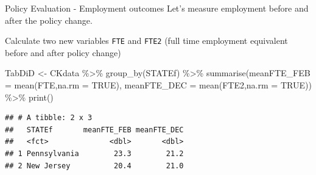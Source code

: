 \documentclass[
  ignorenonframetext,
]{beamer}
\newenvironment{Shaded}{\begin{snugshade}}{\end{snugshade}}
\newcommand{\AttributeTok}[1]{\textcolor[rgb]{0.77,0.63,0.00}{#1}}
\newcommand{\ConstantTok}[1]{\textcolor[rgb]{0.00,0.00,0.00}{#1}}
\newcommand{\FloatTok}[1]{\textcolor[rgb]{0.00,0.00,0.81}{#1}}
\newcommand{\FunctionTok}[1]{\textcolor[rgb]{0.00,0.00,0.00}{#1}}
\newcommand{\NormalTok}[1]{#1}
\newcommand{\OtherTok}[1]{\textcolor[rgb]{0.56,0.35,0.01}{#1}}
\newcommand{\SpecialCharTok}[1]{\textcolor[rgb]{0.00,0.00,0.00}{#1}}
\begin{document}
\begin{frame}[fragile]{Policy Evaluation - Employment outcomes}
\protect\hypertarget{policy-evaluation---employment-outcomes}{}
Let's measure employment before and after the policy change.

Calculate two new variables \texttt{FTE} and \texttt{FTE2} (full time
employment equivalent before and after policy change)

\footnotesize

\begin{Shaded}
\end{Shaded}

\begin{Shaded}
\begin{Highlighting}[]
\NormalTok{TabDiD }\OtherTok{\textless{}{-}}\NormalTok{ CKdata }\SpecialCharTok{\%\textgreater{}\%} \FunctionTok{group\_by}\NormalTok{(STATEf) }\SpecialCharTok{\%\textgreater{}\%} 
          \FunctionTok{summarise}\NormalTok{(}\AttributeTok{meanFTE\_FEB =} \FunctionTok{mean}\NormalTok{(FTE,}\AttributeTok{na.rm =} \ConstantTok{TRUE}\NormalTok{), }
                    \AttributeTok{meanFTE\_DEC =} \FunctionTok{mean}\NormalTok{(FTE2,}\AttributeTok{na.rm =} \ConstantTok{TRUE}\NormalTok{)) }\SpecialCharTok{\%\textgreater{}\%} 
          \FunctionTok{print}\NormalTok{()}
\end{Highlighting}
\end{Shaded}

\begin{verbatim}
## # A tibble: 2 x 3
##   STATEf       meanFTE_FEB meanFTE_DEC
##   <fct>              <dbl>       <dbl>
## 1 Pennsylvania        23.3        21.2
## 2 New Jersey          20.4        21.0
\end{verbatim}

\normalsize
\end{frame}
\end{document}
